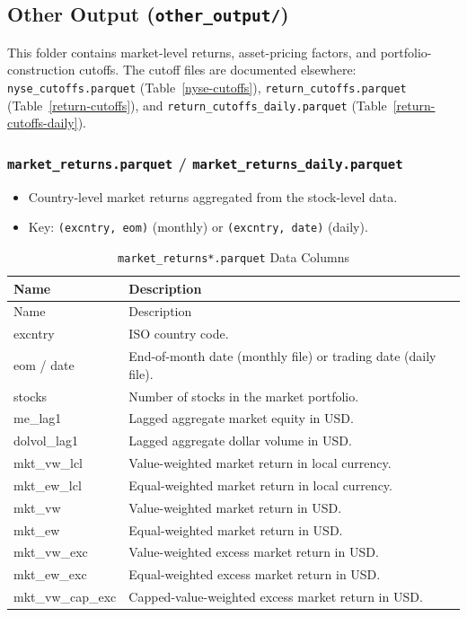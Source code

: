 \documentclass[12pt,title,fleqn]{article}
\begin{document}
\subsection{Other Output (\texttt{other\_output/})}

This folder contains market-level returns, asset-pricing factors, and portfolio-construction cutoffs.  The cutoff files are documented elsewhere: \texttt{nyse\_cutoffs.parquet} (Table~\ref{nyse-cutoffs}), \texttt{return\_cutoffs.parquet} (Table~\ref{return-cutoffs}), and \texttt{return\_cutoffs\_daily.parquet} (Table~\ref{return-cutoffs-daily}).

\subsubsection{\texttt{market\_returns.parquet} / \texttt{market\_returns\_daily.parquet}}\label{sec:market-returns}
\begin{itemize}
  \item Country-level market returns aggregated from the stock-level data.
  \item Key: \texttt{(excntry, eom)} (monthly) or \texttt{(excntry, date)} (daily).
\end{itemize}

{\scriptsize
\begin{longtable}{@{\extracolsep{\fill}}|l|m{14.2cm}|@{}}
\caption{\texttt{market\_returns*.parquet} Data Columns \label{market-returns-cols}}\\
\hline
Name & Description \\
\hline
\endfirsthead
\hline
Name & Description \\
\hline
\endhead
\hline
\endfoot
\hline\hline
\endlastfoot

excntry\rule{0pt}{10pt} & ISO country code. \\[1ex]
eom / date & End-of-month date (monthly file) or trading date (daily file). \\[1ex]
stocks & Number of stocks in the market portfolio. \\[1ex]
me\_lag1 & Lagged aggregate market equity in USD. \\[1ex]
dolvol\_lag1 & Lagged aggregate dollar volume in USD. \\[1ex]
mkt\_vw\_lcl & Value-weighted market return in local currency. \\[1ex]
mkt\_ew\_lcl & Equal-weighted market return in local currency. \\[1ex]
mkt\_vw & Value-weighted market return in USD. \\[1ex]
mkt\_ew & Equal-weighted market return in USD. \\[1ex]
mkt\_vw\_exc & Value-weighted excess market return in USD. \\[1ex]
mkt\_ew\_exc & Equal-weighted excess market return in USD. \\[1ex]
mkt\_vw\_cap\_exc & Capped-value-weighted excess market return in USD. \\[1ex]

\end{longtable}}
\end{document}

